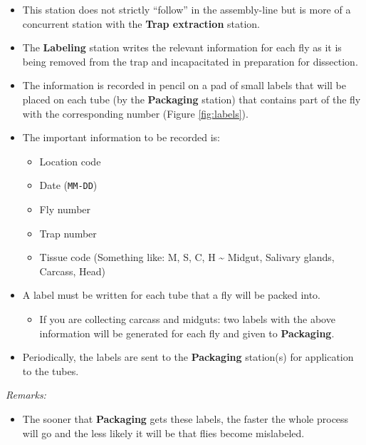 \documentclass[letterpaper]{scrreprt}
\begin{document}
\begin{itemize}
\item
  This station does not strictly ``follow'' in the assembly-line but is
  more of a concurrent station with the \textbf{Trap extraction}
  station.
\item
  The \textbf{Labeling} station writes the relevant information for each
  fly as it is being removed from the trap and incapacitated in
  preparation for dissection.
\item
  The information is recorded in pencil on a pad of small labels that
  will be placed on each tube (by the \textbf{Packaging} station) that
  contains part of the fly with the corresponding number (Figure
  \ref{fig:labels}).
\item
  The important information to be recorded is:

  \begin{itemize}
  \itemsep1pt\parskip0pt
  \item
    Location code
  \item
    Date (\texttt{MM-DD})
  \item
    Fly number
  \item
    Trap number
  \item
    Tissue code (Something like: M, S, C, H \textasciitilde{} Midgut,
    Salivary glands, Carcass, Head)
  \end{itemize}
\item
  A label must be written for each tube that a fly will be packed into.

  \begin{itemize}
  \itemsep1pt\parskip0pt
  \item
    If you are collecting carcass and midguts: two labels with the above
    information will be generated for each fly and given to
    \textbf{Packaging}.
  \end{itemize}
\item
  Periodically, the labels are sent to the \textbf{Packaging} station(s)
  for application to the tubes.
\end{itemize}

\emph{Remarks:}

\begin{itemize}
\itemsep1pt\parskip0pt
\item
  The sooner that \textbf{Packaging} gets these labels, the faster the
  whole process will go and the less likely it will be that flies become
  mislabeled.
\end{itemize}
\end{document}
